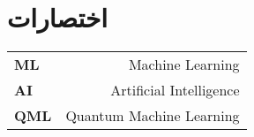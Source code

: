 \section*{اختصارات}
\begin{latin}
\begin{center}
\begin{tabular*}{\textwidth}{@{\extracolsep{\fill} }>{\bfseries}lr}
 {ML}&  Machine Learning\\
 {AI}&  Artificial Intelligence\\
 {QML}&  Quantum Machine Learning\\
 
\end{tabular*}
\end{center}
\end{latin}

\newpage
